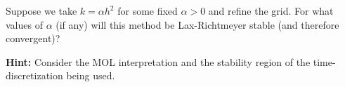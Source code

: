 Suppose we take $k = \alpha h^2$ for some fixed $\alpha > 0$ and refine the grid. For what values of $\alpha$ (if any)
will this method be Lax-Richtmeyer stable (and therefore convergent)?

\textbf{Hint:} Consider the MOL interpretation and the stability region of the time-discretization being used.

\begin{solution}\ \\\\
    \hfill\vfill
    \ \\
\end{solution}